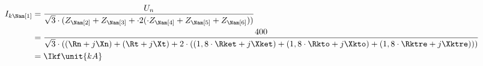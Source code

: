 {\FPeval\all{\yepET + \yepTO + \yepTRE}
\FPifzero{\all}
\begin{align*}
I_{k\Nam[1]} &= \frac{U_n}{\sqrt{3} \cdot(Z_{\Nam[2]} + Z_{\Nam[3]} + \cdot 2 (\cdot Z_{\Nam[4]} + Z_{\Nam[5]} + Z_{\Nam[6]}) ) } \\
	&= \frac{400}{\sqrt{3} \cdot ((\Rn + j\Xn) + (\Rt + j\Xt) + 2 \cdot ((1,8 \cdot\Rket + j\Xket) + (1,8 \cdot\Rkto + j\Xkto) + (1,8 \cdot\Rktre + j\Xktre)))}\\
	&= \Ikf \unit{kA}
\end{align*}
\else
\fi
}


